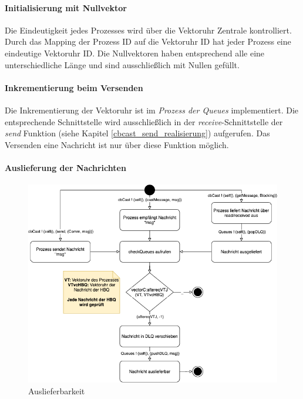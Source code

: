 \paragraph{Initialisierung mit Nullvektor}

Die Eindeutigkeit jedes Prozesses wird über die Vektoruhr Zentrale kontrolliert. Durch das Mapping der Prozess ID auf die Vektoruhr ID hat jeder Prozess eine eindeutige Vektoruhr ID. Die Nullvektoren haben entsprechend alle eine unterschiedliche Länge und sind ausschließlich mit Nullen gefüllt.

\paragraph{Inkrementierung beim Versenden}

Die Inkrementierung der Vektoruhr ist im \textit{Prozess der Queues} implementiert. Die entsprechende Schnittstelle wird ausschließlich in der \textit{receive}-Schnittstelle der \textit{send} Funktion (siehe Kapitel \ref{cbcast_send_realisierung}) aufgerufen. Das Versenden eine Nachricht ist nur über diese Funktion möglich.

\paragraph{Auslieferung der Nachrichten}

\begin{figure}[htbp]
\begin{center}
\includegraphics[scale=0.55]{Latex/Bilder/Auslieferbarkeit.png}
\caption{\label{auslieferbarkeit_analyse} Auslieferbarkeit}
\end{center}
\end{figure}

